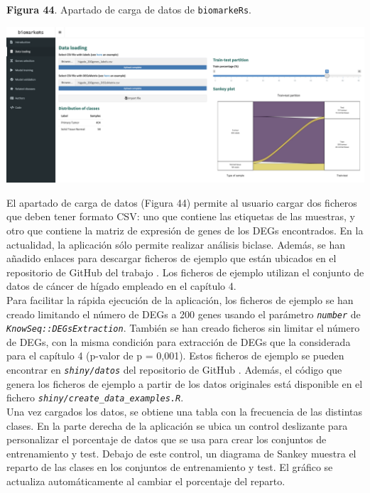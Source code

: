 \begin{center}
	\textbf{Figura 44}. Apartado de carga de datos de \texttt{biomarkeRs}.
\end{center}

\begin{center}
	\includegraphics[width=.90\textwidth]{figuras/44_data_loading.png} \\
\end{center}

El apartado de carga de datos (Figura 44) permite al usuario cargar dos ficheros que deben tener formato CSV: uno que contiene las etiquetas de las muestras, y otro que contiene la matriz de expresión de genes de los DEGs encontrados. En la actualidad, la aplicación sólo permite realizar análisis biclase. Además, se han añadido  enlaces para descargar ficheros de ejemplo que están ubicados en el repositorio de GitHub del trabajo \cite{Redondo-Sanchez2020}. Los ficheros de ejemplo utilizan el conjunto de datos de cáncer de hígado empleado en el capítulo 4.\\

Para facilitar la rápida ejecución de la aplicación, los ficheros de ejemplo se han creado limitando el número de DEGs a 200 genes usando el parámetro \textit{\texttt{number}} de \textit{\texttt{KnowSeq::DEGsExtraction}}. También se han creado ficheros sin limitar el número de DEGs, con la misma condición para extracción de DEGs que la considerada para el capítulo 4 (p-valor de p = 0,001). Estos ficheros de ejemplo se pueden encontrar en \textit{\texttt{shiny/datos}} del repositorio de GitHub \cite{Redondo-Sanchez2020}. Además, el código que genera los ficheros de ejemplo a partir de los datos originales está disponible en el fichero \textit{\texttt{shiny/create\_data\_examples.R}}.\\

Una vez cargados los datos, se obtiene una tabla con la frecuencia de las distintas clases. En la parte derecha de la aplicación se ubica un control deslizante para personalizar el porcentaje de datos que se usa para crear los conjuntos de entrenamiento y test. Debajo de este control, un diagrama de Sankey muestra el reparto de las clases en los conjuntos de entrenamiento y test. El gráfico se actualiza automáticamente al cambiar el porcentaje del reparto.

